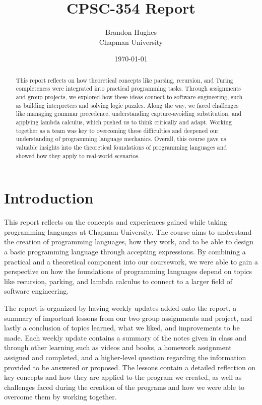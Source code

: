 \documentclass{article}
\title{CPSC-354 Report}
\author{Brandon Hughes \\ Chapman University}
\date{\today}
\theoremstyle{theorem}
\theoremstyle{definition}
\theoremstyle{remark}
\begin{document}
\maketitle

\begin{abstract}
  This report reflects on how theoretical concepts like parsing, recursion, and Turing completeness 
  were integrated into practical programming tasks. Through assignments and group projects, we explored 
  how these ideas connect to software engineering, such as building interpreters and solving logic puzzles.
  Along the way, we faced challenges like managing grammar precedence, understanding capture-avoiding 
  substitution, and applying lambda calculus, which pushed us to think critically and adapt. Working 
  together as a team was key to overcoming these difficulties and deepened our understanding of 
  programming language mechanics. Overall, this course gave us valuable insights into the theoretical 
  foundations of programming languages and showed how they apply to real-world scenarios.
\end{abstract}

\setcounter{tocdepth}{3}
\tableofcontents

\section{Introduction}\label{intro}

This report reflects on the concepts and experiences gained while taking programming languages at 
Chapman University. The course aims to understand the creation of programming languages, how they work, 
and to be able to design a basic programming language through accepting expressions. By combining a 
practical and a theoretical component into our coursework, we were able to gain a perspective on how the 
foundations of programming languages depend on topics like recursion, parking, and lambda calculus to 
connect to a larger field of software engineering.

The report is organized by having weekly updates added onto the report, a summary of important lessons 
from our two group assignments and project, and lastly a conclusion of topics learned, what we liked, 
and improvements to be made. Each weekly update contains a summary of the notes given in class and 
through other learning such as videos and books, a homework assignment assigned and completed, and 
a higher-level question regarding the information provided to be answered or proposed. The lessons 
contain a detailed reflection on key concepts and how they are applied to the program we created, as 
well as challenges faced during the creation of the programs and how we were able to overcome them by 
working together.
\end{document}
